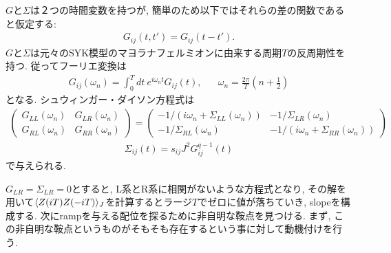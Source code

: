 $G$と$\Sigma$は２つの時間変数を持つが, 簡単のため以下ではそれらの差の関数であると仮定する:
\begin{align}
	G_{ij}(t, t') = G_{ij}(t - t').
\end{align}
$G$と$\Sigma$は元々のSYK模型のマヨラナフェルミオンに由来する周期$T$の反周期性を持つ. 
従ってフーリエ変換は
\begin{align}
	G_{ij}(\omega_n) = \int_0^T dt\ e^{i\omega_nt}G_{ij}(t),
	\hspace{20pt}\omega_n = \frac{2\pi}{T}\left(n + \frac{1}{2}\right)
\end{align}
となる. 
シュウィンガー・ダイソン方程式は
\begin{align}
	\begin{pmatrix}
		G_{LL}(\omega_n) & G_{LR}(\omega_n)\\
		G_{RL}(\omega_n) & G_{RR}(\omega_n)
	\end{pmatrix}
	=
	\begin{pmatrix}
		-1/(i\omega_n + \Sigma_{LL}(\omega_n)) & -1/\Sigma_{LR}(\omega_n)\\
		-1/\Sigma_{RL}(\omega_n) & -1/(i\omega_n + \Sigma_{RR}(\omega_n))
	\end{pmatrix}
	\label{eq:replica_SDeq_1}
\end{align}
\begin{align}
	\Sigma_{ij}(t) = s_{ij}J^2G_{ij}^{q-1}(t)
	\label{eq:replica_SDeq_2}
\end{align}
で与えられる. 

$G_{LR} = \Sigma_{LR} = 0$とすると, L系とR系に相関がないような方程式となり, 
その解を用いて$\langle Z(iT)Z(-iT) \rangle_J$を計算するとラージ$T$でゼロに値が落ちていき, 
slopeを構成する. 
次にrampを与える配位を探るために非自明な鞍点を見つける. 
まず, この非自明な鞍点というものがそもそも存在するという事に対して動機付けを行う. 

